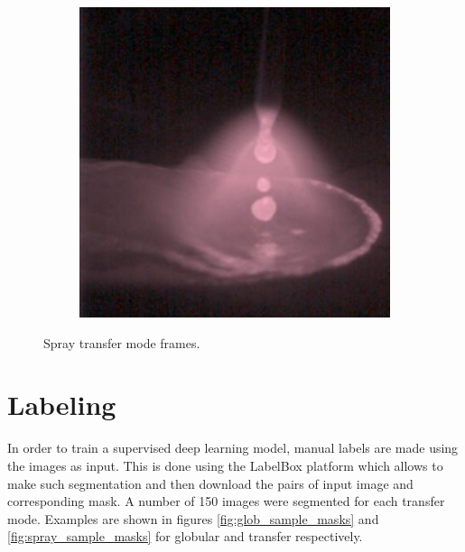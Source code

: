 \begin{figure}[htbp]
\begin{subfigure}[b]{0.3\textwidth}
        \caption{}
    \end{subfigure}
\hfill
    \begin{subfigure}[b]{0.3\textwidth}
        \includegraphics[width=\linewidth]{Images/Dataset/spray_sample_484.jpg}
        \caption{}
    \end{subfigure}

    \caption[Spray transfer mode frames]{Spray transfer mode frames.}
    \label{fig:spray_samples}
\end{figure}

\section{Labeling}
In order to train a supervised deep learning model, manual labels are made using the images as input. This is done using the LabelBox platform which allows to make such segmentation and then download the pairs of input image and corresponding mask. A number of 150 images were segmented for each transfer mode. Examples are shown in figures \ref{fig:glob_sample_masks} and \ref{fig:spray_sample_masks} for globular and transfer respectively.

